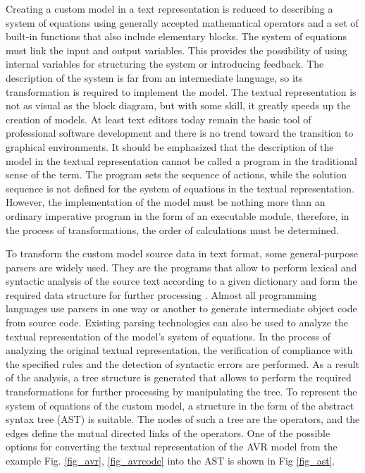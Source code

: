 \documentclass[lettersize,journal]{IEEEtran}
\begin{document}
Creating a custom model in a text representation is reduced to describing a system of equations using generally accepted
mathematical operators and a set of built-in functions that also include elementary blocks. The system of equations must 
link the input and output variables. This provides the possibility of using internal variables for structuring the 
system or introducing feedback. The description of the system is far from an intermediate language, so its transformation 
is required to implement the model. The textual representation is not as visual as the block diagram, 
but with some skill, it greatly speeds up the creation of models. At least text editors today remain the basic tool 
of professional software development and there is no trend toward the transition to graphical environments. 
It should be emphasized that the description of the model in the textual representation cannot be called a program in the
traditional sense of the term. The program sets the sequence of actions, while the solution sequence is not defined for the 
system of equations in the textual representation. However, the implementation of the model must be nothing more than an ordinary
imperative program in the form of an executable module, therefore, in the process of transformations, 
the order of calculations must be determined.

To transform the custom model source data in text format, some general-purpose parsers are widely used. They are the programs
that allow to perform lexical and syntactic analysis of the source text according to a given dictionary and form the required 
data structure for further processing \cite{antlr}. Almost all programming languages use parsers in one way or another to generate 
intermediate object code from source code. Existing parsing technologies can also be used to analyze the textual representation 
of the model's system of equations. In the process of analyzing the original textual representation, the verification of compliance 
with the specified rules and the detection of syntactic errors are performed. As a result of the analysis, a tree structure is
generated that allows to perform the required transformations for further processing by manipulating the tree. To represent the system of equations 
of the custom model, a structure in the form of the abstract syntax tree (AST) is suitable. The nodes of such a tree are the
operators, and the edges define the mutual directed links of the operators. One of the possible options for converting the textual
representation of the AVR model from the example Fig. \ref{fig_avr}, \ref{fig_avrcode} into the AST is shown in Fig \ref{fig_ast}.
\end{document}
